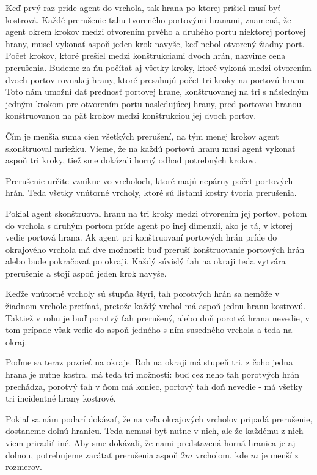 Keď prvý raz príde agent do vrchola, tak hrana po ktorej prišiel musí byť
kostrová.
Každé prerušenie ťahu tvoreného portovými hranami, znamená, že agent okrem
krokov medzi otvorením prvého a druhého portu niektorej portovej hrany,
musel vykonať aspoň jeden krok navyše, keď nebol otvorený žiadny port. 
Počet krokov, ktoré prešiel medzi konštrukciami dvoch hrán, nazvime 
cena prerušenia. Budeme za ňu počítať aj všetky kroky, ktoré vykoná medzi
otvorením dvoch portov rovnakej hrany, ktoré presahujú počet tri kroky na
portovú hranu. Toto nám umožní dať prednosť portovej hrane, konštruovanej na
tri s následným jedným krokom pre otvorením portu nasledujúcej hrany, pred
portovou hranou konštruovanou na päť krokov medzi konštrukciou jej dvoch
portov.

Čím je menšia suma cien všetkých prerušení, na tým menej krokov agent
skonštruoval mriežku.
Vieme, že na každú portovú hranu musí agent vykonať aspoň tri kroky, tiež
sme dokázali horný odhad potrebných krokov.

Prerušenie určite vznikne vo vrcholoch, ktoré majú nepárny počet portových
hrán. Teda všetky vnútorné vrcholy, ktoré sú listami kostry tvoria
prerušenia.

Pokiaľ agent skonštruoval hranu na tri kroky medzi otvorením jej portov,
potom do vrchola s druhým portom príde agent po inej dimenzii, ako je tá,
v ktorej vedie portová hrana. Ak agent pri konštruovaní portových hrán príde
do okrajového vrchola má dve možnosti: buď preruší konštruovanie portových
hrán alebo bude pokračovať po okraji. Každý súvislý ťah na okraji teda
vytvára prerušenie a stojí aspoň jeden krok navyše.

Keďže vnútorné vrcholy sú stupňa štyri, ťah porotvých hrán sa nemôže v
žiadnom vrchole pretínať, pretože každý vrchol má aspoň jednu hranu kostrovú.
Taktiež v rohu je buď porotvý ťah prerušený, alebo doň porotvá hrana
nevedie, v tom prípade však vedie do aspoň jedného s ním susedného vrchola a
teda na okraj.

Poďme sa teraz pozrieť na okraje. Roh na okraji má stupeň tri, z čoho jedna
hrana je nutne kostra. má teda tri možnosti: buď cez neho ťah porotvých hrán
prechádza, porotvý ťah v ňom má koniec, portový ťah doň nevedie - má všetky
tri incidentné hrany kostrové.

Pokiaľ sa nám podarí dokázať, že na veľa okrajových vrcholov pripadá
prerušenie, dostaneme dolnú hranicu. Teda nemusí byť nutne v nich, ale že 
každému z nich viem priradiť iné. Aby sme dokázali, že nami predstavená
horná hranica je aj dolnou, potrebujeme zarátať prerušenia aspoň $2m$
vrcholom, kde $m$ je menší z rozmerov.

